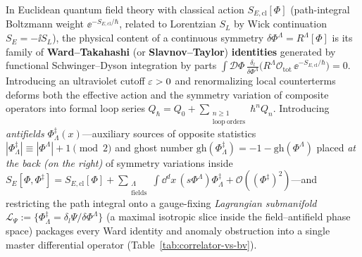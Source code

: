 In Euclidean quantum field theory with classical action $S_{E,\mathrm{cl}}[\Phi]$ (path-integral Boltzmann weight $\ee^{-S_{E,\mathrm{cl}}/\hbar}$, related to Lorentzian $S_L$ by Wick continuation $S_E = -\ii S_L$), the physical content of a continuous symmetry $\delta\Phi^\Lambda = R^\Lambda[\Phi]$ is its family of \textbf{Ward--Takahashi} (or \textbf{Slavnov--Taylor}) \textbf{identities} generated by functional Schwinger--Dyson integration by parts $\int\mathcal{D}\Phi\,\frac{\delta_l}{\delta\Phi^\Lambda}\bigl(R^\Lambda\mathcal{O}_{\mathrm{tot}}\,\ee^{-S_{E,\mathrm{cl}}/\hbar}\bigr) = 0$. Introducing an ultraviolet cutoff $\varepsilon > 0$ and renormalizing local counterterms deforms both the effective action and the symmetry variation of composite operators into formal loop series $Q_\hbar = Q_0 + \sum_{\substack{n \ge 1\\\mathrm{loop\ orders}}} \hbar^n Q_n$. Introducing \emph{antifields} $\Phi^\ddagger_\Lambda(x)$---auxiliary sources of opposite statistics $|\Phi^\ddagger_\Lambda| \equiv |\Phi^\Lambda| + 1 \pmod 2$ and ghost number $\mathrm{gh}(\Phi^\ddagger_\Lambda) = -1 - \mathrm{gh}(\Phi^\Lambda)$ placed \emph{at the back (on the right)} of symmetry variations inside $S_E[\Phi,\Phi^\ddagger] = S_{E,\mathrm{cl}}[\Phi] + \sum_{\substack{\Lambda\\\mathrm{fields}}}\int\dd^dx\,(s\Phi^\Lambda)\Phi^\ddagger_\Lambda + \mathcal{O}((\Phi^\ddagger)^2)$---and restricting the path integral onto a gauge-fixing \emph{Lagrangian submanifold} $\mathcal{L}_\Psi := \{\Phi^\ddagger_\Lambda = \delta_l\Psi/\delta\Phi^\Lambda\}$ (a maximal isotropic slice inside the field--antifield phase space) packages every Ward identity and anomaly obstruction into a single master differential operator (Table~\ref{tab:correlator-vs-bv}).

